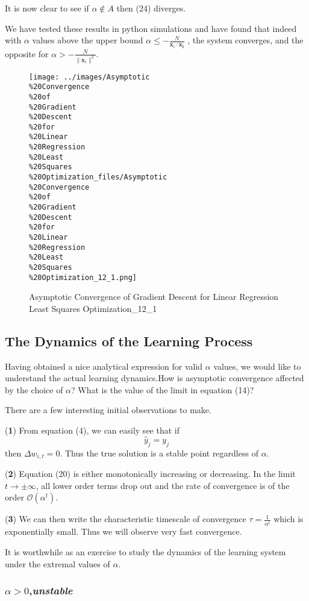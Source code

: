 \documentclass[]{article}
\begin{document}
It is now clear to see if \(\alpha \not\in A\) then (24) diverges.

We have tested these results in python simulations and have found that
indeed with \(\alpha\) values above the upper bound
\(\alpha \le -\frac{N}{\mathbf{x}_i\cdot\mathbf{x_i}}\) , the system
converges, and the opposite for
\(\alpha > -\frac{N}{\| \mathbf{x}_i\|^2}\).

\begin{figure}[htbp]
\centering
\texttt{[image: ../images/Asymptotic\\\%20Convergence\\\%20of\\\%20Gradient\\\%20Descent\\\%20for\\\%20Linear\\\%20Regression\\\%20Least\\\%20Squares\\\%20Optimization\_files/Asymptotic\\\%20Convergence\\\%20of\\\%20Gradient\\\%20Descent\\\%20for\\\%20Linear\\\%20Regression\\\%20Least\\\%20Squares\\\%20Optimization\_12\_1.png]}
\caption{Asymptotic Convergence of Gradient Descent for Linear
Regression Least Squares Optimization\_12\_1}
\end{figure}

\subsection{The Dynamics of the Learning
Process}\label{the-dynamics-of-the-learning-process}

Having obtained a nice analytical expression for valid \(\alpha\)
values, we would like to understand the actual learning dynamics.How is
asymptotic convergence affected by the choice of \(\alpha\)? What is the
value of the limit in equation (14)?

There are a few interesting initial observations to make.

(\textbf{1}) From equation (4), we can easily see that if
\[\hat{y}_j=y_j\] then \(\Delta w_{i,t}=0\). Thus the true solution is a
stable point regardless of \(\alpha\).

(\textbf{2}) Equation (20) is either monotonically increasing or
decreasing. In the limit \(t \to \pm\infty\), all lower order terms drop
out and the rate of convergence is of the order
\(\mathcal{O}(\alpha^t)\).

(\textbf{3}) We can then write the characteristic timescale of
convergence \(\tau = \frac{1}{\alpha^t}\) which is exponentially small.
Thus we will observe very fast convergence.

It is worthwhile as an exercise to study the dynamics of the learning
system under the extremal values of \(\alpha\).

\subsubsection{\(\alpha> 0\),\emph{unstable}}
\end{document}
